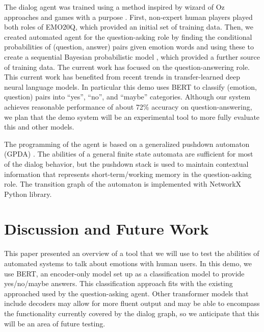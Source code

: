 \documentclass[conference]{IEEEtran}
\begin{document}
The dialog agent was trained using a method inspired by wizard of Oz
approaches \cite{Fraser1991} and games with a purpose
\cite{Ahn2004}. First, non-expert human players played both roles of
EMO20Q, which provided an initial set of training data. Then, we
created automated agent for the question-asking role by finding the
conditional probabilities of (question, answer) pairs given emotion
words and using these to create a sequential Bayesian probabilistic
model \cite{Kazemzadeh2012}, which provided a further source of
training data.  The current work has focused on the question-answering
role.  This current work has benefited from recent trends in
transfer-learned deep neural language models.  In particular
this demo uses BERT \cite{Devlin2019} to classify (emotion, question)
pairs into ``yes'', ``no'', and ``maybe'' categories. Although our
system achieves reasonable performance of about 72\% accuracy on
question-answering, we plan that the demo system will be an
experimental tool to more fully evaluate this and other models.

The programming of the agent is based on a generalized pushdown
automaton (GPDA) \cite{Allauzen2012}.  The abilities of a general
finite state automata are sufficient for most of the dialog behavior,
but the pushdown stack is used to maintain contextual information that
represents short-term/working memory in the question-asking role. The
transition graph of the automaton is implemented with NetworkX Python
library.


\section{Discussion and Future Work}

This paper presented an overview of a tool that we will use to test
the abilities of automated systems to talk about emotions with human
users.  In this demo, we use BERT, an encoder-only model set up as a
classification model to provide yes/no/maybe answers.  This
classification approach fits with the existing approached used by the
question-asking agent. Other transformer models that include decoders
may allow for more fluent output and may be able to encompass the
functionality currently covered by the dialog graph,  so we anticipate
that this will be an area of future testing.
\end{document}
